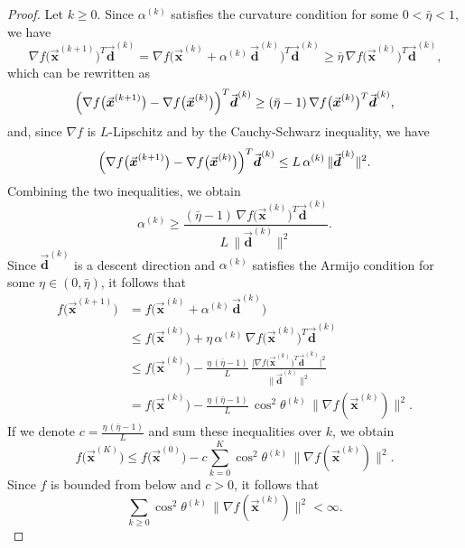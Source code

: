 \documentclass[9pt, headings=standardclasses, parskip=half]{scrartcl}
\newcommand{\vect}[1]{\vec{\boldsymbol{#1}}}
\begin{document}
\begin{proof}
Let \(k \ge 0\). Since \(\alpha^{(k)}\) satisfies the curvature condition for some \(0 < \bar{\eta} < 1\), we have
\[
\nabla f\bigl(\vect{x}^{(k+1)}\bigr)^T \vect{d}^{(k)} = \nabla f\bigl(\vect{x}^{(k)} + \alpha^{(k)}\, \vect{d}^{(k)}\bigr)^T \vect{d}^{(k)} \ge \bar{\eta}\, \nabla f\bigl(\vect{x}^{(k)}\bigr)^T \vect{d}^{(k)} \text{,}
\]
which can be rewritten as
\[
\Bigl(\nabla f\bigl(\vect{x}^{(k+1)}\bigr)-\nabla f\bigl(\vect{x}^{(k)}\bigr)\Bigr)^T \vect{d}^{(k)} \ge (\bar{\eta} - 1)\, \nabla f\bigl(\vect{x}^{(k)}\bigr)^T \vect{d}^{(k)} \text{,}
\]
and, since \(\nabla f\) is \(L\)-Lipschitz and by the Cauchy-Schwarz inequality, we have
\[
\Bigl(\nabla f\bigl(\vect{x}^{(k+1)}\bigr)-\nabla f\bigl(\vect{x}^{(k)}\bigr)\Bigr)^T \vect{d}^{(k)} \le L\, \alpha^{(k)}\, \|\vect{d}^{(k)}\|^2 \text{.}
\]
Combining the two inequalities, we obtain
\[
\alpha^{(k)} \ge \frac{(\bar{\eta}-1)\, \nabla f\bigl(\vect{x}^{(k)}\bigr)^T \vect{d}^{(k)}}{L\, \|\vect{d}^{(k)}\|^2} \text{.}
\]
Since \(\vect{d}^{(k)}\) is a descent direction and \(\alpha^{(k)}\) satisfies the Armijo condition for some \(\eta \in (0,\bar{\eta})\), it follows that
\[
\begin{aligned}
f\bigl(\vect{x}^{(k+1)}\bigr) &= f\bigl(\vect{x}^{(k)} + \alpha^{(k)}\, \vect{d}^{(k)}\bigr) \\
&\le f\bigl(\vect{x}^{(k)}\bigr) + \eta\, \alpha^{(k)}\, \nabla f\bigl(\vect{x}^{(k)}\bigr)^T \vect{d}^{(k)} \\
&\le f\bigl(\vect{x}^{(k)}\bigr) - \frac{\eta\, (\bar{\eta}-1)}{L}\, \frac{\bigl|\nabla f\bigl(\vect{x}^{(k)}\bigr)^T \vect{d}^{(k)}\bigr|^2}{\|\vect{d}^{(k)}\|^2} \\
&= f\bigl(\vect{x}^{(k)}\bigr) - \frac{\eta\, (\bar{\eta}-1)}{L}\, \cos^2\theta^{(k)}\, \|\nabla f(\vect{x}^{(k)})\|^2 \text{.}
\end{aligned}
\]
If we denote \(c = \frac{\eta\, (\bar{\eta}-1)}{L}\) and sum these inequalities over \(k\), we obtain
\[
f\bigl(\vect{x}^{(K)}\bigr) \le f\bigl(\vect{x}^{(0)}\bigr) - c \sum_{k=0}^{K} \cos^2\theta^{(k)}\, \|\nabla f(\vect{x}^{(k)})\|^2 \text{.}
\]
Since \(f\) is bounded from below and \(c > 0\), it follows that
\[
\sum_{k \geq 0} \cos^2\theta^{(k)}\, \|\nabla f(\vect{x}^{(k)})\|^2 < \infty \text{.}
\]
\end{proof}
\end{document}
